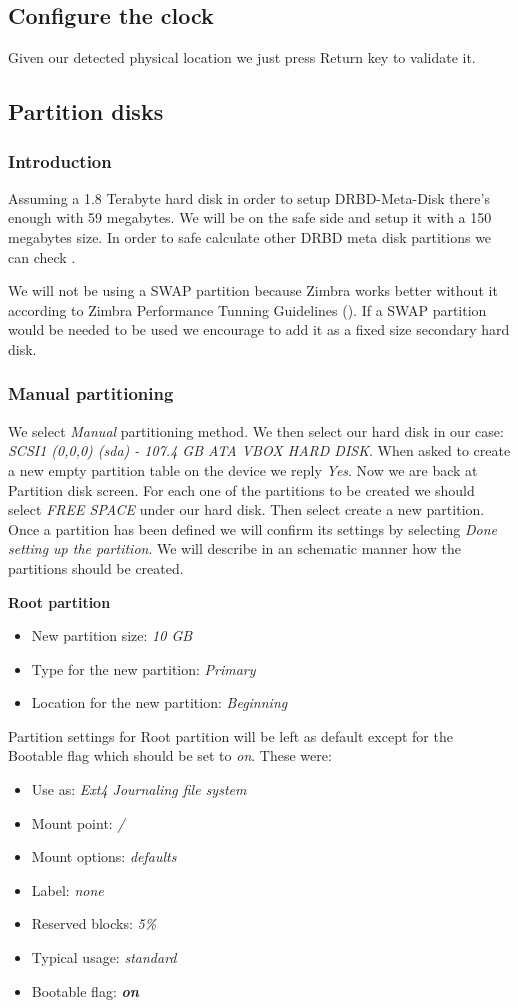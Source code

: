 \subsection {Configure the clock}
Given our detected physical location we just press Return key to validate it.
\subsection {Partition disks}
\subsubsection {Introduction}
Assuming a 1.8 Terabyte hard disk in order to setup DRBD-Meta-Disk there's enough with 59 megabytes. We will be on the safe side and setup it with a 150 megabytes size. In order to safe calculate other DRBD meta disk partitions we can check \cite{LinbitDRBDInternals}.

We will not be using a SWAP partition because Zimbra works better without it according to Zimbra Performance Tunning Guidelines (\cite{ZimbraPerformanceTuning}). If a SWAP partition would be needed to be used we encourage to add it as a fixed size secondary hard disk.

\subsubsection {Manual partitioning}
We select \textit{Manual} partitioning method. We then select our hard disk in our case: \textit{SCSI1 (0,0,0) (sda) - 107.4 GB ATA VBOX HARD DISK}. When asked to create a new empty partition table on the device we reply \textit{Yes}.
Now we are back at Partition disk screen. For each one of the partitions to be created we should select \textit{FREE SPACE} under our hard disk. Then select create a new partition.  Once a partition has been defined we will confirm its settings by selecting \textit{Done setting up the partition}. We will describe in an schematic manner how the partitions should be created.

\textbf{Root partition}
\begin{itemize}
  \item New partition size: \textit{10 GB}
  \item Type for the new partition: \textit {Primary}
  \item Location for the new partition: \textit{Beginning}
\end{itemize}
Partition settings for Root partition will be left as default except for the Bootable flag which should be set to \textit{on}. These were:
\begin{itemize}
  \item Use as: \textit{Ext4 Journaling file system}
  \item Mount point: \textit{/}
  \item Mount options: \textit{defaults}
  \item Label:	\textit{none}
  \item Reserved blocks: \textit{5\%}
  \item Typical usage: \textit{standard}
  \item Bootable flag: \textbf{\textit{on}}
\end{itemize}


